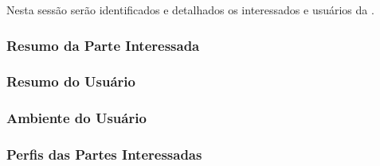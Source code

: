 Nesta sessão serão identificados e detalhados os interessados e usuários da \nomeferramenta{}.

\subsubsection{Resumo da Parte Interessada}

\subsubsection{Resumo do Usuário}

\subsubsection{Ambiente do Usuário} 

\subsubsection{Perfis das Partes Interessadas}


